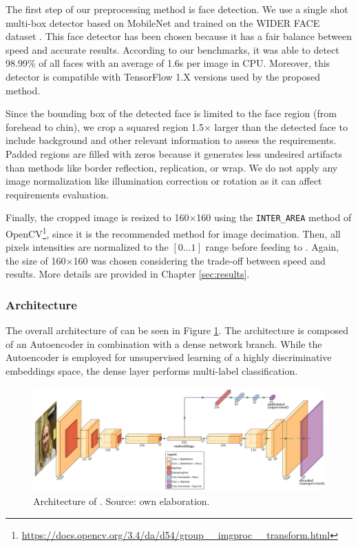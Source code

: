 The first step of our preprocessing method is face detection. We use a single shot multi-box detector based on MobileNet \citep{yeephycho} and trained on the WIDER FACE dataset \citep{yang2016wider}. This face detector has been chosen because it has a fair balance between speed and accurate results. According to our benchmarks, it was able to detect 98.99\% of all faces with an average of 1.6s per image in CPU. Moreover, this detector is compatible with TensorFlow 1.X versions used by the proposed method. 

Since the bounding box of the detected face is limited to the face region (from forehead to chin), we crop a squared region 1.5$\times$ larger than the detected face to include background and other relevant information to assess the requirements. Padded regions are filled with zeros because it generates less undesired artifacts than methods like border reflection, replication, or wrap. We do not apply any image normalization like illumination correction or rotation as it can affect requirements evaluation. 

Finally, the cropped image is resized to 160$\times$160 using the \texttt{INTER\_AREA} method of OpenCV\footnote{\url{https://docs.opencv.org/3.4/da/d54/group__imgproc__transform.html}}, since it is the recommended method for image decimation. Then, all pixels intensities are normalized to the $[0...1]$ range before feeding to \methodname. Again, the size of 160$\times$160 was chosen considering the trade-off between speed and results. More details are provided in Chapter \ref{sec:results}. 

\subsubsection{Architecture}

The overall architecture of \methodname can be seen in Figure \ref{fig:icaonet}. The architecture is composed of an Autoencoder in combination with a dense network branch. While the Autoencoder is employed for unsupervised learning of a highly discriminative embeddings space, the dense layer performs multi-label classification. 

\begin{figure}
\centering
\includegraphics[width=\linewidth]{images/icaonet.pdf}
\caption{Architecture of \methodname. Source: own elaboration.}
\label{fig:icaonet}
\end{figure}

